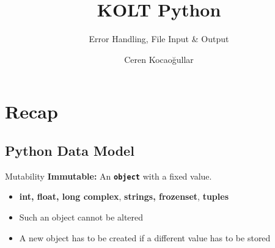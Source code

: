 
\usepackage{../KU-Beamer-Template/style/koc}
\usepackage{minted}
\usepackage{upquote}
\usepackage{graphicx}
\usepackage{tikz}
\usetikzlibrary{shapes.symbols,positioning, chains}

\title{KOLT Python}
\subtitle{Error Handling, File Input \& Output}
\date{}
\author{Ceren Kocaoğullar}




    \maketitle


    \section{Recap}
        \subsection{Python Data Model}


\begin{frame}{Mutability}
        \huge
        \textbf{Immutable:}
        \LARGE
        An \texttt{\textbf{object}} with a fixed value.
        \begin{itemize}
             \item \textbf{int, float, long complex}, \textbf{strings, frozenset}, \textbf{tuples}
            \item Such an object cannot be altered
            \item A new object has to be created if a different value has to be stored
        \end{itemize}

\end{frame}

